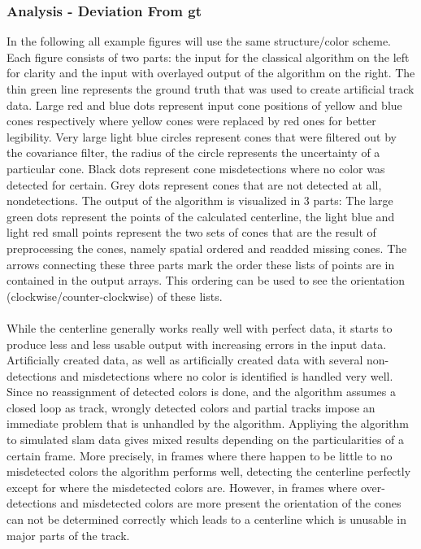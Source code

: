 \subsubsection{Analysis - Deviation From \ac{gt}}
In the following all example figures will use the same structure/color scheme. Each figure consists of two parts: the input for the classical algorithm on the left for clarity and the input with overlayed output of the algorithm on the right. The thin green line represents the ground truth that was used to create artificial track data. Large red and blue dots represent input cone positions of yellow and blue cones respectively where yellow cones were replaced by red ones for better legibility. Very large light blue circles represent cones that were filtered out by the covariance filter, the radius of the circle represents the uncertainty of a particular cone. Black dots represent cone misdetections where no color was detected for certain. Grey dots represent cones that are not detected at all, nondetections. The output of the algorithm is visualized in 3 parts: The large green dots represent the points of the calculated centerline, the light blue and light red small points represent the two sets of cones that are the result of preprocessing the cones, namely spatial ordered and readded missing cones. The arrows connecting these three parts mark the order these lists of points are in contained in the output arrays. This ordering can be used to see the orientation (clockwise/counter-clockwise) of these lists. \\ \\
While the centerline generally works really well with perfect data, it starts to produce less and less usable output with increasing errors in the input data. Artificially created data, as well as artificially created data with several non-detections and misdetections where no color is identified is handled very well. \\
Since no reassignment of detected colors is done, and the algorithm assumes a closed loop as track, wrongly detected colors and partial tracks impose an immediate problem that is unhandled by the algorithm.
Appliying the algorithm to simulated \ac{slam} data gives mixed results depending on the particularities of a certain frame. More precisely, in frames where there happen to be little to no misdetected colors the algorithm performs well, detecting the centerline perfectly except for where the misdetected colors are. However, in frames where over-detections and misdetected colors are more present the orientation of the cones can not be determined correctly which leads to a centerline which is unusable in major parts of the track. 
